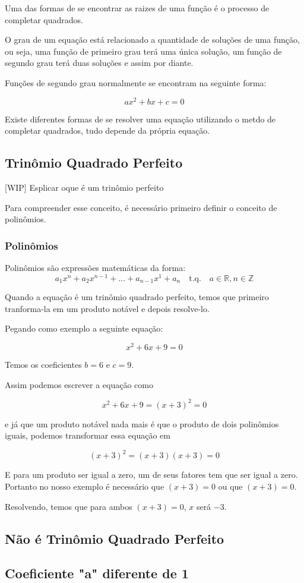 \documentclass[../resumo.tex]{subfiles}
\begin{document}
	Uma das formas de se encontrar as raizes de uma função é o processo de completar quadrados.

	O grau de um equação está relacionado a quantidade de soluções de uma função, ou seja, uma função
	de primeiro grau terá uma única solução, um função de segundo grau terá duas soluções e assim por diante.

	Funções de segundo grau normalmente se encontram na seguinte forma:

	\[ ax^2 + bx + c = 0 \]

	Existe diferentes formas de se resolver uma equação utilizando o metdo de completar quadrados, tudo depende 
	da própria equação.

	\subsection{Trinômio Quadrado Perfeito}

	[WIP] Esplicar oque é um trinômio perfeito

	Para compreender esse conceito, é necessário primeiro definir o conceito de polinômios.

	\subsubsection{Polinômios}

	Polinômios são expressões matemáticas da forma:
	\[a_1x^n + a_2x^{n-1} + ... + a_{n-1}x^1 + a_n \quad \textrm{t.q.} \quad a \in \mathbb{R}, n \in \mathbb{Z}\]


	Quando a equação é um trinômio quadrado perfeito, temos que primeiro tranforma-la em um produto notável
	e depois resolve-lo.

	Pegando como exemplo a seguinte equação:

	\[ x^2 + 6x + 9 = 0 \]

	Temos os coeficientes $b = 6$ e $c = 9$.

	Assim podemos escrever a equação como

	\[ x^2 + 6x + 9 = (x + 3)^2 = 0 \]

	e já que um produto notável nada mais é que o produto de dois polinômios iguais, podemos transformar 
	essa equação em

	\[ (x + 3)^2 = (x + 3)(x + 3) = 0 \]

	E para um produto ser igual a zero, um de seus fatores tem que ser igual a zero. Portanto no nosso exemplo
	é necessário que $(x + 3) = 0$ ou que $(x + 3) = 0$.

	Resolvendo, temos que para ambos $(x + 3) = 0$, $x$ será $-3$. 

	\subsection{Não é Trinômio Quadrado Perfeito}

	\subsection{Coeficiente "a" diferente de 1}
\end{document}
